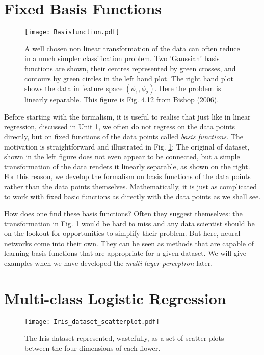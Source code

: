 \section{Fixed Basis Functions}

\begin{figure}[!ht]
  \begin{center}
    \texttt{[image: Basisfunction.pdf]}
  \end{center}
  \caption{A well chosen non linear transformation of the data can often reduce in a much simpler classification problem. Two 'Gaussian' basis functions
    are shown, their centres represented by green crosses, and contours by green circles in the left hand plot. The right hand plot shows the
    data in feature space $(\phi_1, \phi_2)$. Here the problem is linearly separable. This figure
  is Fig. 4.12 from Bishop (2006).}
   \label{fig-circular}
\end{figure}

Before starting with the formalism, it is useful to realise that just like in linear regression, discussed in Unit 1, we often do not regress on the data points
directly, but on fixed functions of the data points called \emph{basis functions}. The motivation is straightforward and illustrated in Fig. \ref{fig-circular}:
The original of dataset, shown in the left figure does not even  appear to be connected, but a simple transformation of the data renders it linearly separable,
as shown on the right.
For this reason, we develop the formalism on basis functions of the data points rather than the data points themselves. Mathematically, it is just as
complicated to work with fixed basic functions as directly with the data points as we shall see.

 How does one find these basis functions? Often they suggest themselves: the transformation in Fig. \ref{fig-circular} would be hard to miss and any data scientist
 should be on the lookout for opportunities to simplify their problem. But here, neural networks come into their own. They can be seen as methods that are capable
 of learning basis functions that are appropriate for a given dataset. We will give examples when we have developed the \emph{multi-layer perceptron} later.

\section{Multi-class Logistic Regression}
  \begin{figure}
    \begin{center}
      \texttt{[image: Iris\_dataset\_scatterplot.pdf]}
    \end{center}
    \caption{The Iris dataset represented, wastefully, as a set of scatter plots between the four dimensions of each flower.}
    \label{fig-iris}
  \end{figure}

